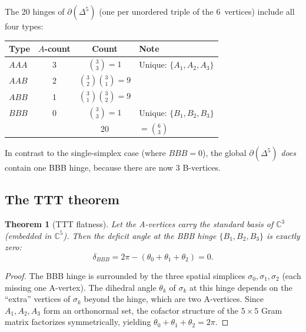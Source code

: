 \documentclass[12pt]{article}
\newtheorem{theorem}{Theorem}[section]
\theoremstyle{remark}
\theoremstyle{definition}
\begin{document}
The 20 hinges of $\partial(\Delta^5)$ (one per unordered triple of the 6~vertices) include all four types:

\begin{center}
\begin{tabular}{lccl}
\toprule
Type & $A$-count & Count & Note \\
\midrule
$AAA$ & 3 & $\binom{3}{3} = 1$ & Unique: $\{A_1, A_2, A_3\}$ \\
$AAB$ & 2 & $\binom{3}{2}\binom{3}{1} = 9$ & \\
$ABB$ & 1 & $\binom{3}{1}\binom{3}{2} = 9$ & \\
$BBB$ & 0 & $\binom{3}{3} = 1$ & Unique: $\{B_1, B_2, B_3\}$ \\
\midrule
& & 20 & $= \binom{6}{3}$ \\
\bottomrule
\end{tabular}
\end{center}

\noindent
In contrast to the single-simplex case (where $BBB = 0$), the global $\partial(\Delta^5)$ \emph{does} contain one BBB hinge, because there are now 3 B-vertices.

\subsection{The TTT theorem}
\label{sec:ttt}

\begin{theorem}[TTT flatness]
\label{thm:ttt}
Let the A-vertices carry the standard basis of $\mathbb{C}^3$ (embedded in $\mathbb{C}^5$).  Then the deficit angle at the BBB hinge $\{B_1, B_2, B_3\}$ is exactly zero:
\begin{equation}
\delta_{BBB} = 2\pi - (\theta_0 + \theta_1 + \theta_2) = 0.
\end{equation}
\end{theorem}

\begin{proof}
The BBB hinge is surrounded by the three spatial simplices $\sigma_0, \sigma_1, \sigma_2$ (each missing one A-vertex).  The dihedral angle $\theta_k$ of $\sigma_k$ at this hinge depends on the ``extra'' vertices of $\sigma_k$ beyond the hinge, which are two A-vertices.  Since $A_1, A_2, A_3$ form an orthonormal set, the cofactor structure of the $5 \times 5$ Gram matrix factorizes symmetrically, yielding $\theta_0 + \theta_1 + \theta_2 = 2\pi$.
\end{proof}
\end{document}
